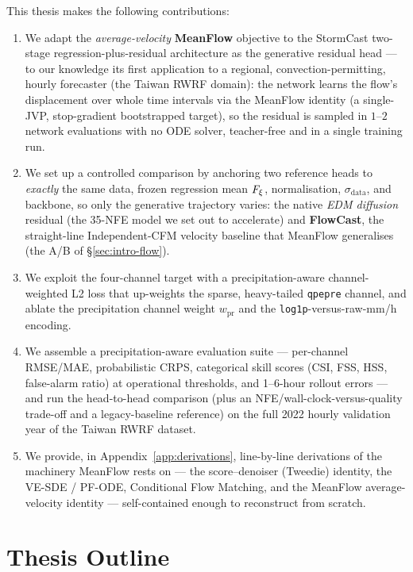 This thesis makes the following contributions:
\begin{enumerate}
  \item We adapt the \emph{average-velocity} \textbf{MeanFlow} objective \citep{geng2025meanflow} to the StormCast two-stage regression-plus-residual architecture as the generative residual head --- to our knowledge its first application to a regional, convection-permitting, hourly forecaster (the Taiwan RWRF domain): the network learns the flow's displacement over whole time intervals via the MeanFlow identity (a single-JVP, stop-gradient bootstrapped target), so the residual is sampled in $1$--$2$ network evaluations with no ODE solver, teacher-free and in a single training run.
  \item We set up a controlled comparison by anchoring two reference heads to \emph{exactly} the same data, frozen regression mean $F_{\xi}$, normalisation, $\sigma_{\text{data}}$, and backbone, so only the generative trajectory varies: the native \emph{EDM diffusion} residual (the 35-NFE model we set out to accelerate) and \textbf{FlowCast}, the straight-line Independent-CFM velocity baseline \citep{lipman2023flow,tong2024improving,ribeiro2025flowcast} that MeanFlow generalises (the A/B of \S\ref{sec:intro-flow}).
  \item We exploit the four-channel target with a precipitation-aware channel-weighted L2 loss that up-weights the sparse, heavy-tailed \texttt{qpepre} channel, and ablate the precipitation channel weight $w_{\text{pr}}$ and the \texttt{log1p}-versus-raw-mm/h encoding.
  \item We assemble a precipitation-aware evaluation suite --- per-channel RMSE/MAE, probabilistic CRPS, categorical skill scores (CSI, FSS, HSS, false-alarm ratio) at operational thresholds, and 1--6-hour rollout errors --- and run the head-to-head comparison (plus an NFE/wall-clock-versus-quality trade-off and a legacy-baseline reference) on the full 2022 hourly validation year of the Taiwan RWRF dataset.
  \item We provide, in Appendix~\ref{app:derivations}, line-by-line derivations of the machinery MeanFlow rests on --- the score--denoiser (Tweedie) identity, the VE-SDE / PF-ODE, Conditional Flow Matching, and the MeanFlow average-velocity identity --- self-contained enough to reconstruct from scratch.
\end{enumerate}

\section{Thesis Outline}
\label{sec:intro-outline}

